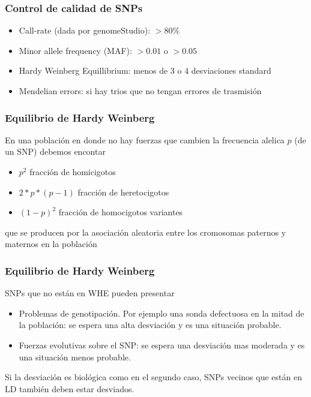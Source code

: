 \documentclass{beamer}\usepackage[]{graphicx}\usepackage[]{color}
\begin{document}
\begin{frame}[fragile]
\frametitle{Control de calidad de SNPs}

\begin{itemize}
\item Call-rate (dada por genomeStudio): $>80\%$
\item Minor allele frequency (MAF): $>0.01$ o $>0.05$
\item Hardy Weinberg Equillibrium: menos de 3 o 4 desviaciones standard 
\item Mendelian errors: si hay trios que no tengan errores de trasmisi\'on
\end{itemize}

\end{frame}

\begin{frame}[fragile]
\frametitle{Equilibrio de Hardy Weinberg}

En una poblaci\'on en donde no hay fuerzas que cambien la frecuencia alelica $p$ (de un SNP)
debemos encontar
\begin{itemize}
\item $p^2$ fracci\'on de homicigotos
\item $2*p*(p-1)$ fracci\'on de heretocigotos
\item $(1-p)^2$ fracci\'on de homocigotos variantes
\end{itemize}

que se producen por la asociaci\'on aleatoria entre los cromosomas paternos y maternos en la poblaci\'on


\end{frame}



\begin{frame}[fragile]
\frametitle{Equilibrio de Hardy Weinberg}

SNPs que no est\'an en WHE pueden presentar

\begin{itemize}
\item Problemas de genotipaci\'on. Por ejemplo una sonda defectuosa en la mitad de la poblaci\'on: se espera una alta desviaci\'on y es una situación probable.
\item Fuerzas evolutivas sobre el SNP: se espera una desviaci\'on mas moderada y es una situaci\'on menos probable.
\end{itemize}

Si la desviaci\'on es biol\'ogica como en el segundo caso, SNPs vecinos que est\'an en LD tambi\'en deben estar desviados. 

\end{frame}
\end{document}
